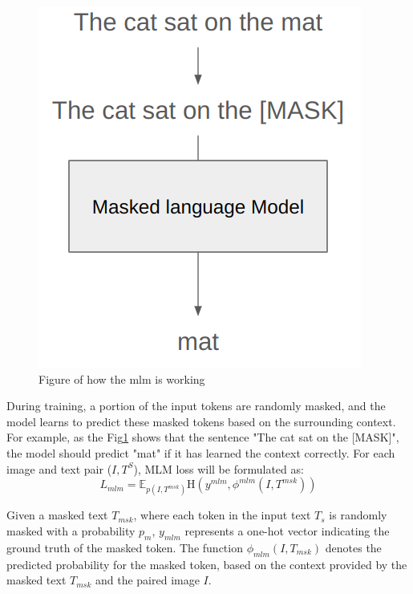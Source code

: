 \begin{figure}
  \includegraphics[width=\linewidth]{img/mlm_flow.png}
  \caption{Figure of how the mlm is working}
  \label{fig:mlm_flow}
\end{figure}

During training, a portion of the input tokens are randomly masked, and the model learns to predict these masked tokens based on the surrounding context. For example, as the Fig\ref{fig:mlm_flow} shows that the sentence "The cat sat on the [MASK]", the model should predict "mat" if it has learned the context correctly. For each image and text pair ($I,T^S$), MLM loss will be formulated as:
\[
  L_{mlm} = \mathbb{E}_{p \left( I,T^{msk}\right) }\mathrm{H}\left(y^{mlm}, \phi^{mlm}\left(I,T^{msk}\right)\right)
\]

Given a masked text \( T_{msk} \), where each token in the input text \( T_s \) is randomly masked with a probability \( p_m \), \( y_{mlm} \) represents a one-hot vector indicating the ground truth of the masked token. The function \( \phi_{mlm}(I, T_{msk}) \) denotes the predicted probability for the masked token, based on the context provided by the masked text \( T_{msk} \) and the paired image \( I \).

